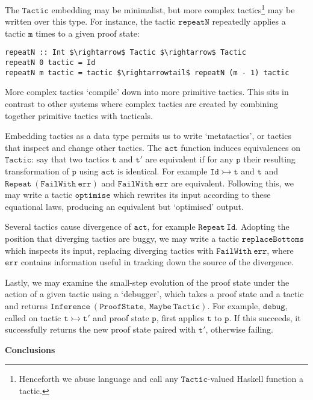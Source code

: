 \documentclass{llncs}
\begin{document}
The $\mathtt{Tactic}$ embedding may be minimalist, but more complex tactics\footnote{Henceforth we abuse language and call any $\mathtt{Tactic}$-valued Haskell function a tactic.} may be written over this type.
For instance, the tactic $\mathtt{repeatN}$ repeatedly applies a tactic $\mathtt{m}$ times to a given proof state:
\begin{lstlisting}
repeatN :: Int $\rightarrow$ Tactic $\rightarrow$ Tactic
repeatN 0 tactic = Id
repeatN m tactic = tactic $\rightarrowtail$ repeatN (m - 1) tactic
\end{lstlisting}

More complex tactics `compile' down into more primitive tactics.
This sits in contrast to other systems where complex tactics are created by combining together primitive tactics with tacticals.

Embedding tactics as a data type permits us to write `metatactics', or tactics that inspect and change other tactics.
The $\mathtt{act}$ function induces equivalences on $\mathtt{Tactic}$: say that two tactics $\mathtt{t}$ and $\mathtt{t'}$ are equivalent if for any $\mathtt{p}$ their resulting transformation of $\mathtt{p}$ using $\mathtt{act}$ is identical.
For example $\mathtt{Id \rightarrowtail t}$ and $\mathtt{t}$ and $\mathtt{Repeat\ (FailWith\ err)}$ and $\mathtt{FailWith\ err}$ are equivalent.
Following this, we may write a tactic $\mathtt{optimise}$ which rewrites its input according to these equational laws, producing an equivalent but `optimised' output.

Several tactics cause divergence of $\mathtt{act}$, for example $\mathtt{Repeat\ Id}$.
Adopting the position that diverging tactics are buggy, we may write a tactic $\mathtt{replaceBottoms}$ which inspects its input, replacing diverging tactics with $\mathtt{FailWith\ err}$, where $\mathtt{err}$ contains information useful in tracking down the source of the divergence.

Lastly, we may examine the small-step evolution of the proof state under the action of a given tactic using a `debugger', which takes a proof state and a tactic and returns $\mathtt{Inference\ (ProofState,\ Maybe\ Tactic)}$.
For example, $\mathtt{debug}$, called on tactic $\mathtt{t \rightarrowtail t'}$ and proof state $\mathtt{p}$, first applies $\mathtt{t}$ to $\mathtt{p}$.
If this succeeds, it successfully returns the new proof state paired with $\mathtt{t'}$, otherwise failing.

\noindent\newline
\textbf{Conclusions}
\newline
\end{document}
